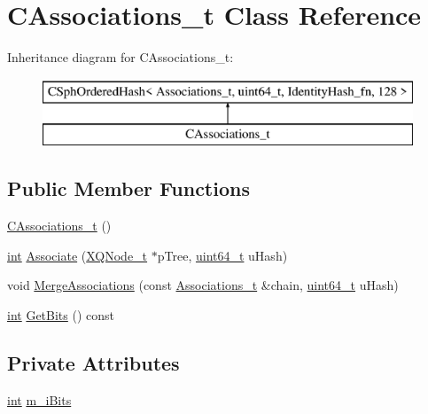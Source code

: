 \hypertarget{classCAssociations__t}{\section{C\-Associations\-\_\-t Class Reference}
\label{classCAssociations__t}
}
Inheritance diagram for C\-Associations\-\_\-t\-:\begin{figure}[H]
\begin{center}
\leavevmode
\includegraphics[height=2.000000cm]{classCAssociations__t}
\end{center}
\end{figure}
\subsection*{Public Member Functions}
\begin{DoxyCompactItemize}
\item 
\hyperlink{classCAssociations__t_ac78f0b0dd8d3e0dde315b245561928b5}{C\-Associations\-\_\-t} ()
\item 
\hyperlink{sphinxexpr_8cpp_a4a26e8f9cb8b736e0c4cbf4d16de985e}{int} \hyperlink{classCAssociations__t_a7cb8c7266380ed27e934f05f1c86ba37}{Associate} (\hyperlink{structXQNode__t}{X\-Q\-Node\-\_\-t} $\ast$p\-Tree, \hyperlink{sphinxstd_8h_aaa5d1cd013383c889537491c3cfd9aad}{uint64\-\_\-t} u\-Hash)
\item 
void \hyperlink{classCAssociations__t_aeec3ee196a71458907e707df9987ea78}{Merge\-Associations} (const \hyperlink{classAssociations__t}{Associations\-\_\-t} \&chain, \hyperlink{sphinxstd_8h_aaa5d1cd013383c889537491c3cfd9aad}{uint64\-\_\-t} u\-Hash)
\item 
\hyperlink{sphinxexpr_8cpp_a4a26e8f9cb8b736e0c4cbf4d16de985e}{int} \hyperlink{classCAssociations__t_a08432b752bfe7341639c19fb106e6c6c}{Get\-Bits} () const 
\end{DoxyCompactItemize}
\subsection*{Private Attributes}
\begin{DoxyCompactItemize}
\item 
\hyperlink{sphinxexpr_8cpp_a4a26e8f9cb8b736e0c4cbf4d16de985e}{int} \hyperlink{classCAssociations__t_a9a9fb344c357a789ffba723385ee70db}{m\-\_\-i\-Bits}
\end{DoxyCompactItemize}
